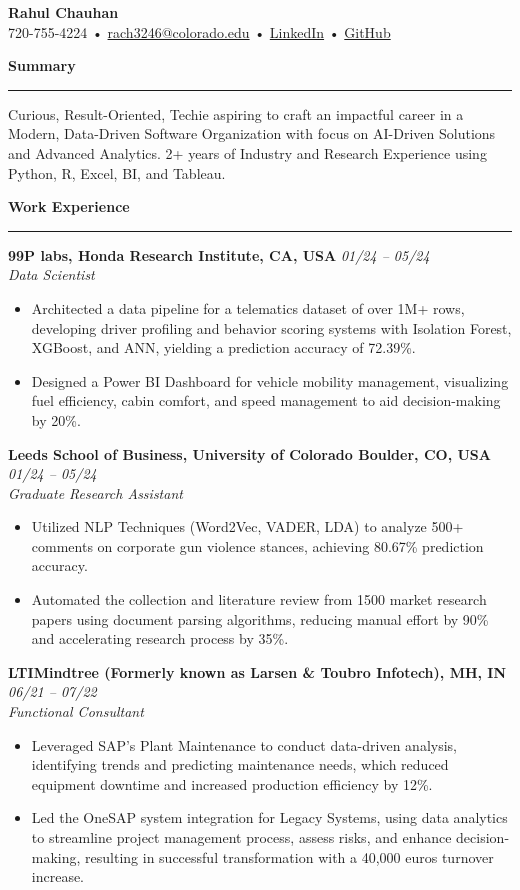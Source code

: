 \documentclass[10pt]{article}
\newcommand{\sectiontitle}[1]{\vspace{0.5em}\textbf{\large #1}\vspace{0.5em}\hrule\vspace{0.5em}}
\newcommand{\jobtitle}[1]{\textbf{#1}}
\newcommand{\daterange}[1]{\hfill\textit{#1}}
\begin{document}
\begin{center}
    \textbf{\Huge Rahul Chauhan} \\
    \vspace{0.2em}
    720-755-4224 • \href{mailto:rach3246@colorado.edu}{rach3246@colorado.edu} • \href{https://linkedin.com/in/rahul-chauhan}{LinkedIn} • \href{https://github.com/rahul-chauhan}{GitHub} \\
\end{center}

\sectiontitle{Summary}
Curious, Result-Oriented, Techie aspiring to craft an impactful career in a Modern, Data-Driven Software Organization with focus on AI-Driven Solutions and Advanced Analytics. 2+ years of Industry and Research Experience using Python, R, Excel, BI, and Tableau.

\sectiontitle{Work Experience}
\jobtitle{99P labs, Honda Research Institute, CA, USA} \daterange{01/24 – 05/24} \\
\textit{Data Scientist}
\begin{itemize}[leftmargin=*]
    \item Architected a data pipeline for a telematics dataset of over 1M+ rows, developing driver profiling and behavior scoring systems with Isolation Forest, XGBoost, and ANN, yielding a prediction accuracy of 72.39\%.
    \item Designed a Power BI Dashboard for vehicle mobility management, visualizing fuel efficiency, cabin comfort, and speed management to aid decision-making by 20\%.
\end{itemize}

\jobtitle{Leeds School of Business, University of Colorado Boulder, CO, USA} \daterange{01/24 – 05/24} \\
\textit{Graduate Research Assistant}
\begin{itemize}[leftmargin=*]
    \item Utilized NLP Techniques (Word2Vec, VADER, LDA) to analyze 500+ comments on corporate gun violence stances, achieving 80.67\% prediction accuracy.
    \item Automated the collection and literature review from 1500 market research papers using document parsing algorithms, reducing manual effort by 90\% and accelerating research process by 35\%.
\end{itemize}

\jobtitle{LTIMindtree (Formerly known as Larsen \& Toubro Infotech), MH, IN} \daterange{06/21 – 07/22} \\
\textit{Functional Consultant}
\begin{itemize}[leftmargin=*]
    \item Leveraged SAP’s Plant Maintenance to conduct data-driven analysis, identifying trends and predicting maintenance needs, which reduced equipment downtime and increased production efficiency by 12\%.
    \item Led the OneSAP system integration for Legacy Systems, using data analytics to streamline project management process, assess risks, and enhance decision-making, resulting in successful transformation with a 40,000 euros turnover increase.
\end{itemize}
\end{document}
